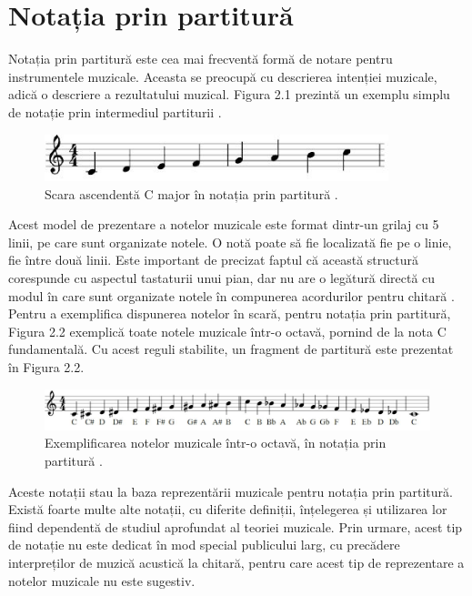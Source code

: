 \documentclass[a4paper,12pt]{report}
\begin{document}
\section{Notația prin partitură}
Notația prin partitură este cea mai frecventă formă de notare 
pentru instrumentele muzicale. Aceasta se preocupă cu 
descrierea intenției muzicale, adică o descriere a rezultatului muzical.
Figura 2.1 prezintă un exemplu simplu de notație prin intermediul 
partiturii \cite{Generating-Guitar-Tablatures-with-Neural-Networks}.

\begin{figure}[h!]
    \centering
    \includegraphics[width=10cm]{..//resources//images//partitura.JPG}
    \caption{Scara ascendentă C major în notația prin partitură \cite{Generating-Guitar-Tablatures-with-Neural-Networks}.}
\end{figure}

Acest model de prezentare a notelor muzicale este format dintr-un 
grilaj cu 5 linii, pe care sunt organizate notele. O notă 
poate să fie localizată fie pe o linie, fie între două 
linii. Este important de precizat faptul că această structură 
corespunde cu aspectul tastaturii unui pian, dar nu are o 
legătură directă cu modul în care sunt organizate notele 
în compunerea acordurilor pentru chitară \cite{Generating-Guitar-Tablatures-with-Neural-Networks}. 
Pentru a exemplifica 
dispunerea notelor în scară, pentru notația prin partitură,
Figura 2.2 exemplică toate notele muzicale într-o octavă, 
pornind de la nota C fundamentală. Cu acest reguli stabilite,
un fragment de partitură este prezentat în Figura 2.2.

\begin{figure}[h!]
    \centering
    \includegraphics[width=15.8cm]{..//resources//images//partitura_2.JPG}
    \caption{Exemplificarea notelor muzicale într-o octavă, în notația 
    prin partitură \cite{Generating-Guitar-Tablatures-with-Neural-Networks}.}
    \label{}
\end{figure}

Aceste notații stau la baza reprezentării muzicale pentru notația prin partitură.
Există foarte multe alte notații, cu diferite definiții, înțelegerea și 
utilizarea lor fiind dependentă de studiul aprofundat al teoriei muzicale. 
Prin urmare, acest tip de notație nu este dedicat în mod special publicului 
larg, cu precădere interpreților de muzică acustică la chitară, pentru 
care acest tip de reprezentare a notelor muzicale nu este sugestiv.
\end{document}
